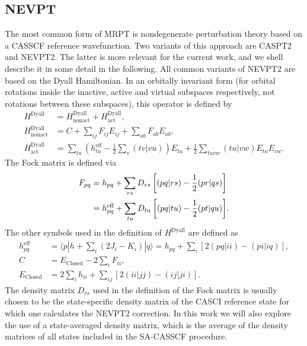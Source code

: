 \subsection{NEVPT}
\label{Sec:NEVPT2}
The most common form of MRPT is nondegenerate perturbation theory based on a CASSCF reference wavefunction. Two variants of this approach are CASPT2\cite{AnderMRSW_1990_5483, AnderMR_1992_1218} and NEVPT2.\cite{AngelCELM_2001_10252, AngelCM_2001_297, AngelCM_2002_9138} The latter is more relevant for the current work, and we shell describe it in some detail in the following. All common variants of NEVPT2 are based on the Dyall Hamiltonian.\cite{Dyall_1995_4909} In an orbitally invariant form\cite{AngelPC_2007_743} (for orbital rotations inside the inactive, active and virtual subspaces respectively, not rotations between these subspaces), this operator is defined by
\begin{align}
\label{Eq:HDyall}{H^{{\text{Dyall}}}} &= H^\text{Dyall}_\text{nonact} + H^\text{Dyall}_\text{act}, \\
H^\text{Dyall}_\text{nonact} &= C + \sum\limits_{ij} {{F_{ij}}E_{ij}} + \sum\limits_{ab} {{F_{ab}}E_{ab}},  \\
H^\text{Dyall}_\text{act} &= \sum\limits_{tu} {(h_{tu}^\text{eff} - \tfrac{1}{2}\sum\limits_v {(tv|vu)} )E_{tu} + \tfrac{1}{2}\sum\limits_{tuvw} {(tu|vw)E_{tu}E_{vw}} }. 
\end{align}
The Fock matrix is defined via
\begin{equation}
\begin{split}
  {F_{pq}} &= {h_{pq}} + \sum\limits_{rs} {{D_{rs}}\left[ {(pq|rs) - \frac{1}{2}(pr|qs)} \right]}  \hfill \\
  \,\,\,\,\,\,\,\, &= h_{pq}^{{\text{eff}}} + \sum\limits_{tu} {{D_{tu}}\left[ {(pq|tu) - \frac{1}{2}(pt|qu)} \right]}.  \\ 
\end{split} 
\end{equation}						
The other symbols used in the definition of $H^\text{Dyall}$ are defined as
\begin{align}
h_{pq}^{{\text{eff}}} &= \langle p|h + \sum\limits_i {(2{J_i} - {K_i})} |q\rangle  = {h_{pq}} + \sum\limits_i {\left[ {2(pq|ii) - (pi|iq)} \right]}, \label{Eq:heff}\\
C &= {E_{{\text{Closed}}}} - 2\sum\limits_i {{F_{ii}}}, \\
{E_{{\text{Closed}}}} &= 2\sum\limits_i {{h_{ii}}}  + \sum\limits_{ij} {[2(ii|jj) - (ij|ji)]}. 
\end{align}
The density matrix $D_{rs}$ used in the definition of the Fock matrix is usually chosen to be the state-specific density matrix of the CASCI reference state for which one calculates the NEVPT2 correction. In this work we will also explore the use of a state-averaged density matrix, which is the average of the density matrices of all states included in the SA-CASSCF procedure.

